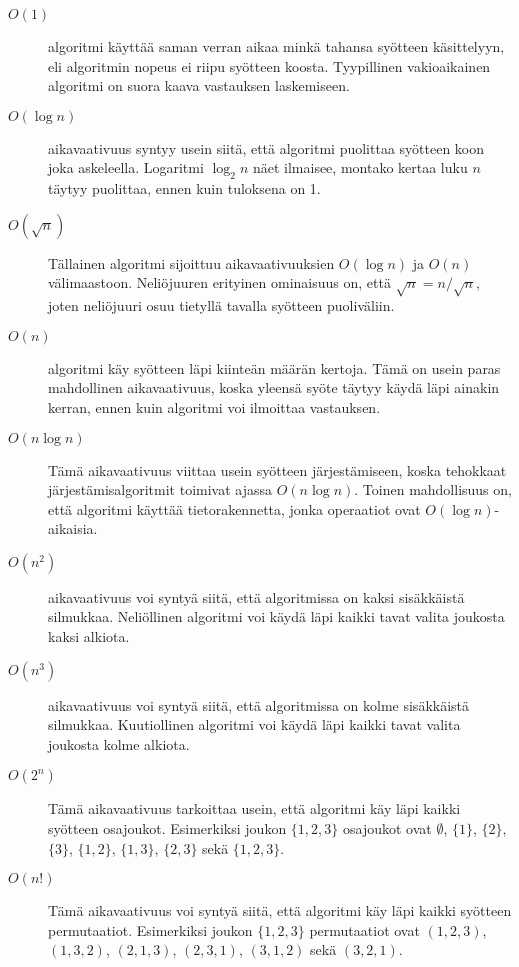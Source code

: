 \begin{description}
\item[$O(1)$]
 algoritmi
käyttää saman verran aikaa minkä tahansa
syötteen käsittelyyn,
eli algoritmin nopeus ei riipu syötteen koosta.
Tyypillinen vakioaikainen algoritmi on suora kaava
vastauksen laskemiseen.

\item[$O(\log n)$]
 aikavaativuus
syntyy usein siitä, että algoritmi
puolittaa syötteen koon joka askeleella.
Logaritmi $\log_2 n$ näet ilmaisee, montako
kertaa luku $n$ täytyy puolittaa,
ennen kuin tuloksena on 1.

\item[$O(\sqrt n)$]

Tällainen algoritmi sijoittuu
aikavaativuuksien $O(\log n)$ ja $O(n)$ välimaastoon.
Neliöjuuren erityinen ominaisuus on,
että $\sqrt n = n/\sqrt n$, joten neliöjuuri
osuu tietyllä tavalla syötteen puoliväliin.

\item[$O(n)$]
 algoritmi käy syötteen läpi
kiinteän määrän kertoja.
Tämä on usein paras mahdollinen aikavaativuus,
koska yleensä syöte täytyy käydä
läpi ainakin kerran,
ennen kuin algoritmi voi ilmoittaa vastauksen.

\item[$O(n \log n)$]

Tämä aikavaativuus viittaa usein
syötteen järjestämiseen,
koska tehokkaat järjestämisalgoritmit toimivat
ajassa $O(n \log n)$.
Toinen mahdollisuus on, että algoritmi
käyttää tietorakennetta,
jonka operaatiot ovat $O(\log n)$-aikaisia.

\item[$O(n^2)$]
 aikavaativuus voi syntyä
siitä, että algoritmissa on 
kaksi sisäkkäistä silmukkaa.
Neliöllinen algoritmi voi käydä läpi kaikki
tavat valita joukosta kaksi alkiota.

\item[$O(n^3)$]
 aikavaativuus voi syntyä siitä,
että algoritmissa on 
kolme sisäkkäistä silmukkaa.
Kuutiollinen algoritmi voi käydä läpi kaikki
tavat valita joukosta kolme alkiota.

\item[$O(2^n)$]

Tämä aikavaativuus tarkoittaa usein,
että algoritmi käy läpi kaikki syötteen osajoukot.
Esimerkiksi joukon $\{1,2,3\}$ osajoukot ovat
$\emptyset$, $\{1\}$, $\{2\}$, $\{3\}$, $\{1,2\}$,
$\{1,3\}$, $\{2,3\}$ sekä $\{1,2,3\}$.

\item[$O(n!)$]

Tämä aikavaativuus voi syntyä siitä,
että algoritmi käy läpi kaikki syötteen permutaatiot.
Esimerkiksi joukon $\{1,2,3\}$ permutaatiot ovat
$(1,2,3)$, $(1,3,2)$, $(2,1,3)$, $(2,3,1)$,
$(3,1,2)$ sekä $(3,2,1)$.

\end{description}

